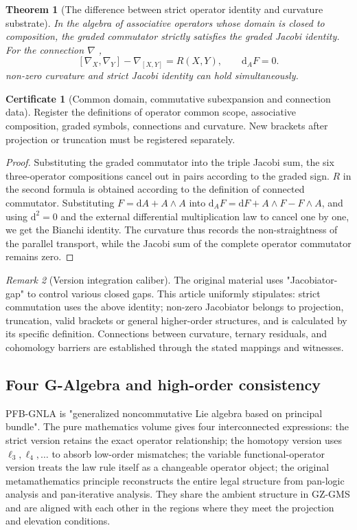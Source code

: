 \documentclass[11pt,a4paper]{article}
\theoremstyle{plain}
\newtheorem{theorem}{Theorem}[section]
\theoremstyle{definition}
\newtheorem*{certificate}{Certificate}
\theoremstyle{remark}
\newtheorem{remark}[theorem]{Remark}
\begin{document}
\begin{CJK*}
\begin{theorem}
[The difference between strict operator identity and curvature substrate]\label{fa:thm-strict}
In the algebra of associative operators whose domain is closed to composition, the graded commutator strictly satisfies the graded Jacobi identity. For the connection $\nabla$ , \[
 [\nabla_X,\nabla_Y]-\nabla_{[X,Y]}=R(X,Y),\qquad
 \mathrm d_A F=0.
\] non-zero curvature and strict Jacobi identity can hold simultaneously.\end{theorem}
\begin{certificate}
[Common domain, commutative subexpansion and connection data]Register the definitions of operator common scope, associative composition, graded symbols, connections and curvature. New brackets after projection or truncation must be registered separately.\end{certificate}
\begin{proof}
Substituting the graded commutator into the triple Jacobi sum, the six three-operator compositions cancel out in pairs according to the graded sign. $R$ in the second formula is obtained according to the definition of connected commutator. Substituting $F=\mathrm dA+A\wedge A$ into $\mathrm d_AF=\mathrm dF+A\wedge F-F\wedge A$, and using $\mathrm d^2=0$ and the external differential multiplication law to cancel one by one, we get the Bianchi identity. The curvature thus records the non-straightness of the parallel transport, while the Jacobi sum of the complete operator commutator remains zero.\end{proof}


\begin{remark}
[Version integration caliber]The original material uses "Jacobiator-gap" to control various closed gaps. This article uniformly stipulates: strict commutation uses the above identity; non-zero Jacobiator belongs to projection, truncation, valid brackets or general higher-order structures, and is calculated by its specific definition. Connections between curvature, ternary residuals, and cohomology barriers are established through the stated mappings and witnesses.\end{remark}


\subsection { Four G-Algebra and high-order consistency }

PFB-GNLA is "generalized noncommutative Lie algebra based on principal bundle". The pure mathematics volume gives four interconnected expressions: the strict version retains the exact operator relationship; the homotopy version uses $\ell_3,\ell_4,\ldots$ to absorb low-order mismatches; the variable functional-operator version treats the law rule itself as a changeable operator object; the original metamathematics principle reconstructs the entire legal structure from pan-logic analysis and pan-iterative analysis. They share the ambient structure in GZ-GMS and are aligned with each other in the regions where they meet the projection and elevation conditions. \cite{S01,S07,S09}


\end{CJK*}
\end{document}
